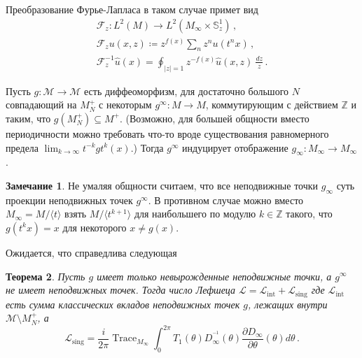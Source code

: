 \documentclass[a4paper, 12pt]{article}
\newtheorem{theorem}{Теорема}[section]
\theoremstyle{definition}
\newtheorem{remark}[theorem]{Замечание}
\begin{document}
Преобразование Фурье-Лапласа в таком случае примет вид \[
    \begin{gathered}
        \mathcal F_{z} : L^2(M) \to L^2(M_{\infty} \times \mathbb S^{1}_{z})\,, \\
        \mathcal F_{z}u(x, z) \coloneqq z^{f(x)} \sum_{n} z^{n} u(t^{n} x)\,, \\
        \mathcal F_{z}^{-1} \hat{u}(x) = \oint_{\lvert z \rvert = 1} z^{-f(x)} \hat{u}(x, z)\: \frac{dz}{z}\,.
    \end{gathered}
\]

Пусть \({ g : \mathcal M \to \mathcal M }\) есть диффеоморфизм, для достаточно большого \({ N }\) совпадающий на \({ M^{+}_{N} }\) с некоторым \({ g^{\infty} : M \to M }\), коммутирующим с действием \({ \mathbb Z }\) и таким, что \({ g(M^{+}_{N}) \subseteq M^{+} }\). (Возможно, для большей общности вместо периодичности можно требовать что-то вроде существования равномерного предела \({ \lim_{k \to \infty} t^{-k} g t^{k} (x) }\).) Тогда \({ g^{\infty} }\) индуцирует отображение \({ g_{\infty} : M_{\infty} \to M_{\infty} }\).

\begin{remark}
    \label{rm:fixed_points_are_projections}
    Не умаляя общности считаем, что все неподвижные точки \({ g_{\infty} }\) суть проекции неподвижных точек \({ g^{\infty} }\). В противном случае можно вместо \({ M_{\infty} = M / \langle t \rangle }\) взять \({ M / \langle t^{k + 1} \rangle }\) для наибольшего по модулю \({ k \in \mathbb Z }\) такого, что \({ g(t^{k} x) = x }\) для некоторого \({ x \neq g(x) }\).
\end{remark}

Ожидается, что справедлива следующая

\begin{theorem}
    \label{thm:preiodic_singular_contribution}
    Пусть \({ g }\) имеет только невырожденные неподвижные точки, а \({ g^{\infty} }\) не имеет неподвижных точек. Тогда число Лефшеца \({ 
        \mathcal L = \mathcal L_{\operatorname{int}} + \mathcal L_{\operatorname{sing}} 
    }\) где \({ \mathcal L_{\operatorname{int}} }\) есть сумма классических вкладов неподвижных точек \({ g }\), лежащих внутри \({ \mathcal M \setminus M^{+}_{N} }\), а 
    \begin{equation}
        \label{eq:L_sing}
        \mathcal L_{\operatorname{sing}} = \frac{i}{2\pi} \operatorname{Trace}_{M_{\infty}} \int_{0}^{2 \pi} T_{1}(\theta) D^{^{-1}}_{\infty}(\theta) \frac{\partial D_{\infty}}{\partial \theta}(\theta) d\theta\,.
    \end{equation}
\end{theorem}
\end{document}
